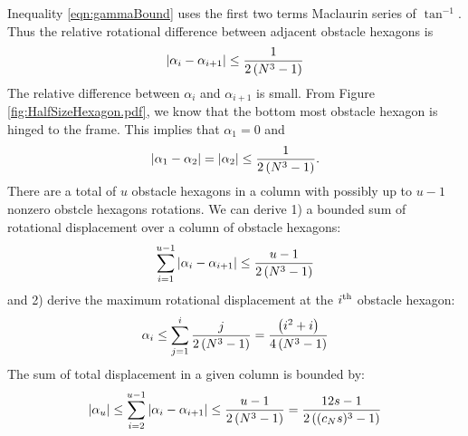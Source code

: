 Inequality \ref{eqn:gammaBound} uses the first two terms Maclaurin series of $\tan^{-1}$.
Thus the relative rotational difference between adjacent obstacle hexagons is
\begin{equation}\label{eqn:angularBound}
\left\vert \alpha_i - \alpha_{i+1} \right\vert \leq \frac{1}{2\left( N^3 - 1 \right)}
\end{equation}
The relative difference between $\alpha_i$ and $\alpha_{i+1}$ is small.
From Figure \ref{fig:HalfSizeHexagon.pdf}, we know that the bottom most obstacle hexagon is hinged to the frame.  
This implies that $\alpha_1 = 0$ and
$$\left\vert \alpha_1 - \alpha_2 \right\vert=\left\vert \alpha_2 \right\vert\leq \frac{1}{2\left( N^3 - 1 \right)}.$$
There are a total of $u$ obstacle hexagons in a column with possibly up to $u-1$ nonzero obstcle hexagons rotations.
We can derive 1) a bounded sum of rotational displacement over a column of obstacle hexagons:
\begin{equation}\label{eqn:angularSumBound}
\sum_{i=1}^{u-1} \vert \alpha_i - \alpha_{i+1} \vert \leq \frac{u-1}{2\left( N^3 - 1 \right)}
\end{equation}
and 2) derive the maximum rotational displacement at the $i^\text{th}$ obstacle hexagon:
\begin{equation}\label{eqn:angularMaxBound}
\alpha_i \leq \sum_{j=1}^i\frac{j}{2\left( N^3 - 1 \right)}=\frac{\left( i^2 + i \right)}{4\left( N^3-1 \right)}
\end{equation}
The sum of total displacement in a given column is bounded by:
$$ \vert \alpha_u \vert \leq \sum_{i=2}^{u-1} \vert \alpha_i - \alpha_{i+1} \vert \leq \frac{u-1}{2\left( N^3 - 1 \right)}= \frac{12s - 1}{2 \left(  (c_N s)^3 - 1 \right)}$$